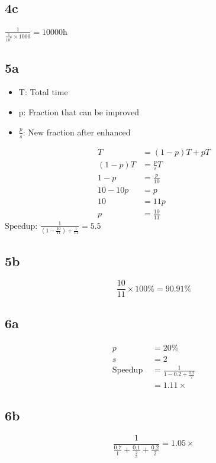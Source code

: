 \documentclass{article}
\begin{document}
\begin{multicols}{2}
    \subsection*{4c}
    \( \frac{1}{\frac{1}{10^7}\times1000} = 10000\si{\hour} \)
    \subsection*{5a}
    \begin{itemize}
        \item T\@: Total time
        \item p: Fraction that can be improved
        \item \(\frac{p}{s}\): New fraction after enhanced
    \end{itemize}
    \begin{align*}
        T       & = \left( 1-p \right) T + p T \\
        (1-p) T & = \frac{p}{s} T              \\
        1-p     & = \frac{p}{10}               \\
        10-10p  & = p                          \\
        10      & = 11p                        \\
        p       & = \frac{10}{11}
    \end{align*}
    \(\text{Speedup: }\frac{1}{\left( 1 - \frac{10}{11} \right) + \frac{1}{11}} = 5.5\)
    \subsection*{5b}
    \[
        \frac{10}{11} \times 100 \% = 90.91 \%
    \]
    \subsection*{6a}
    \begin{align*}
        p               & = 20\%                           \\
        s               & = 2                              \\
        \text{Speedup } & =\frac{1}{1-0.2 + \frac{0.2}{2}} \\
                        & = 1.11\times
    \end{align*}
    \subsection*{6b}
    \[
        \frac{1}{\frac{0.7}{1} + \frac{0.1}{\frac{2}{3}} + \frac{0.2}{2}}= 1.05\times
    \]

\end{multicols}
\end{document}
